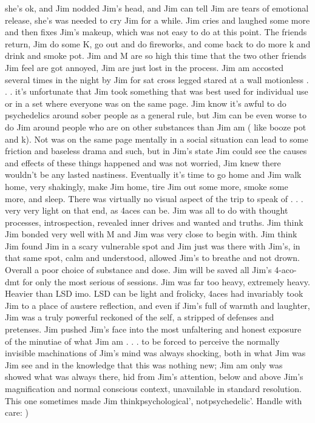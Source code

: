\documentclass[12pt]{book}
\begin{document}
she's ok, and Jim nodded Jim's head, and Jim can tell Jim are tears of emotional release, she's was needed to cry Jim for a while. Jim cries and laughed some more and then fixes Jim's makeup, which was not easy to do at this point. The friends return, Jim do some K, go out and do fireworks, and come back to do more k and drink and smoke pot. Jim and M are so high this time that the two other friends Jim feel are got annoyed, Jim are just lost in the process. Jim am accosted several times in the night by Jim for sat cross legged stared at a wall motionless . . . it's unfortunate that Jim took something that was best used for individual use or in a set where everyone was on the same page. Jim know it's awful to do psychedelics around sober people as a general rule, but Jim can be even worse to do Jim around people who are on other substances than Jim am ( like booze pot and k). Not was on the same page mentally in a social situation can lead to some friction and baseless drama and such, but in Jim's state Jim could see the causes and effects of these things happened and was not worried, Jim knew there wouldn't be any lasted nastiness. Eventually it's time to go home and Jim walk home, very shakingly, make Jim home, tire Jim out some more, smoke some more, and sleep. There was virtually no visual aspect of the trip to speak of . . . very very light on that end, as 4aces can be. Jim was all to do with thought processes, introspection, revealed inner drives and wanted and truths. Jim think Jim bonded very well with M and Jim was very close to begin with. Jim think Jim found Jim in a scary vulnerable spot and Jim just was there with Jim's, in that same spot, calm and understood, allowed Jim's to breathe and not drown. Overall a poor choice of substance and dose. Jim will be saved all Jim's 4-aco-dmt for only the most serious of sessions. Jim was far too heavy, extremely heavy. Heavier than LSD imo. LSD can be light and frolicky, 4aces had invariably took Jim to a place of austere reflection, and even if Jim's full of warmth and laughter, Jim was a truly powerful reckoned of the self, a stripped of defenses and pretenses. Jim pushed Jim's face into the most unfaltering and honest exposure of the minutiae of what Jim am . . . to be forced to perceive the normally invisible machinations of Jim's mind was always shocking, both in what Jim was Jim see and in the knowledge that this was nothing new; Jim am only was showed what was always there, hid from Jim's attention, below and above Jim's magnification and normal conscious context, unavailable in standard resolution. This one sometimes made Jim thinkpsychological', notpsychedelic'. Handle with care: )
\end{document}
